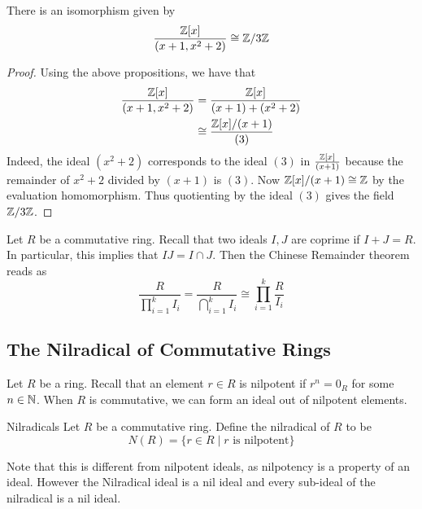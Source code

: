 \documentclass[a4paper]{article}
\begin{document}
\begin{eg}{}{} There is an isomorphism given by $$\frac{\mathbb{Z}[x]}{(x+1,x^2+2)}\cong\mathbb{Z}/3\mathbb{Z}$$ \tcbline
\begin{proof}
Using the above propositions, we have that 
\begin{align*}
\frac{\mathbb{Z}[x]}{(x+1,x^2+2)}&=\frac{\mathbb{Z}[x]}{(x+1)+(x^2+2)}\\
&\cong\frac{\mathbb{Z}[x]/(x+1)}{(3)}
\end{align*}
Indeed, the ideal $(x^2+2)$ corresponds to the ideal $(3)$ in $\frac{\mathbb{Z}[x]}{(x+1)}$ because the remainder of $x^2+2$ divided by $(x+1)$ is $(3)$. Now $\mathbb{Z}[x]/(x+1)\cong\mathbb{Z}$ by the evaluation homomorphism. Thus quotienting by the ideal $(3)$ gives the field $\mathbb{Z}/3\mathbb{Z}$. 
\end{proof}
\end{eg}

Let $R$ be a commutative ring. Recall that two ideals $I,J$ are coprime if $I+J=R$. In particular, this implies that $IJ=I\cap J$. Then the Chinese Remainder theorem reads as $$\frac{R}{\prod_{i=1}^kI_i}=\frac{R}{\bigcap_{i=1}^kI_i}\cong\prod_{i=1}^k\frac{R}{I_i}$$

\subsection{The Nilradical of Commutative Rings}
Let $R$ be a ring. Recall that an element $r\in R$ is nilpotent if $r^n=0_R$ for some $n\in\mathbb{N}$. When $R$ is commutative, we can form an ideal out of nilpotent elements. 

\begin{defn}{Nilradicals}{} Let $R$ be a commutative ring. Define the nilradical of $R$ to be $$N(R)=\{r\in R\;|\;r\text{ is nilpotent}\}$$
\end{defn}

Note that this is different from nilpotent ideals, as nilpotency is a property of an ideal. However the Nilradical ideal is a nil ideal and every sub-ideal of the nilradical is a nil ideal. 
\end{document}

